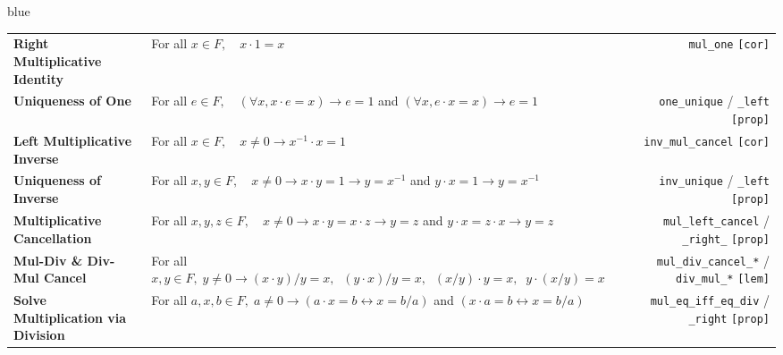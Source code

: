 \documentclass[10pt]{article}
\newcommand{\lean}[1]{\texttt{\scriptsize\color{navy}#1}}
\newcommand{\kind}[1]{\texttt{\scriptsize\color{muted}[#1]}}
\begin{document}
\begin{axbox}[title={Group 2: Multiplicative Group on $F \setminus \{0\}$ (Identities, Inverses, Cancellation \& Division)}]{blue}
\scriptsize
\begin{tabularx}{\linewidth}{@{}>{\raggedright\arraybackslash}p{4.2cm} >{\raggedright\arraybackslash}X r@{}}
\textbf{Right Multiplicative Identity} & For all $x \in F,\quad x \cdot 1 = x$ & \lean{mul\_one} \kind{cor} \\
\textbf{Uniqueness of One} & For all $e \in F,\quad (\forall x, x \cdot e = x) \to e = 1$ \quad and \quad $(\forall x, e \cdot x = x) \to e = 1$ & \lean{one\_unique} / \lean{\_left} \kind{prop} \\
\textbf{Left Multiplicative Inverse} & For all $x \in F,\quad x \neq 0 \to x^{-1} \cdot x = 1$ & \lean{inv\_mul\_cancel} \kind{cor} \\
\textbf{Uniqueness of Inverse} & For all $x, y \in F,\quad x \neq 0 \to x \cdot y = 1 \to y = x^{-1}$ \quad and \quad $y \cdot x = 1 \to y = x^{-1}$ & \lean{inv\_unique} / \lean{\_left} \kind{prop} \\
\textbf{Multiplicative Cancellation} & For all $x, y, z \in F,\quad x \neq 0 \to x \cdot y = x \cdot z \to y = z$ \quad and \quad $y \cdot x = z \cdot x \to y = z$ & \lean{mul\_left\_cancel} / \lean{\_right\_} \kind{prop} \\
\textbf{Mul-Div \& Div-Mul Cancel} & For all $x, y \in F,\; y \neq 0 \to (x \cdot y)/y = x,\;\; (y \cdot x)/y = x,\;\; (x/y)\cdot y = x,\;\; y \cdot (x/y) = x$ & \lean{mul\_div\_cancel\_*} / \lean{div\_mul\_*} \kind{lem} \\
\textbf{Solve Multiplication via Division} & For all $a, x, b \in F,\; a \neq 0 \to (a \cdot x = b \leftrightarrow x = b / a)$ \quad and \quad $(x \cdot a = b \leftrightarrow x = b / a)$ & \lean{mul\_eq\_iff\_eq\_div} / \lean{\_right} \kind{prop} \\
\end{tabularx}
\end{axbox}
\end{document}
